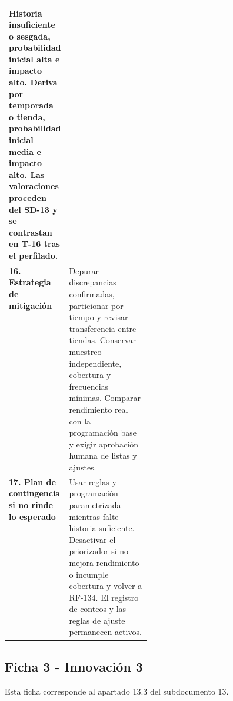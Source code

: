 \documentclass[11pt]{article}
\begin{document}
\begin{longtable}{@{}>{\raggedright\arraybackslash}p{0.28\linewidth}>{\raggedright\arraybackslash}p{}@{}}
Historia insuficiente o sesgada, probabilidad inicial alta e impacto alto. Deriva por temporada o tienda, probabilidad inicial media e impacto alto. Las valoraciones proceden del SD-13 y se contrastan en T-16 tras el perfilado.
\\
\midrule
\textbf{16. Estrategia de mitigación}\label{estrategia-de-mitigaciuxf3n-1} &
Depurar discrepancias confirmadas, particionar por tiempo y revisar transferencia entre tiendas. Conservar muestreo independiente, cobertura y frecuencias mínimas. Comparar rendimiento real con la programación base y exigir aprobación humana de listas y ajustes.
\\
\midrule
\textbf{17. Plan de contingencia si no rinde lo esperado}\label{plan-de-contingencia-si-no-rinde-lo-esperado-1} &
Usar reglas y programación parametrizada mientras falte historia suficiente. Desactivar el priorizador si no mejora rendimiento o incumple cobertura y volver a RF-134. El registro de conteos y las reglas de ajuste permanecen activos.
\\
\end{longtable}

\subsection*{Ficha 3 - Innovación 3}\label{ficha-3-innovaciuxf3n-3}

Esta ficha corresponde al apartado 13.3 del subdocumento 13.
\end{document}
